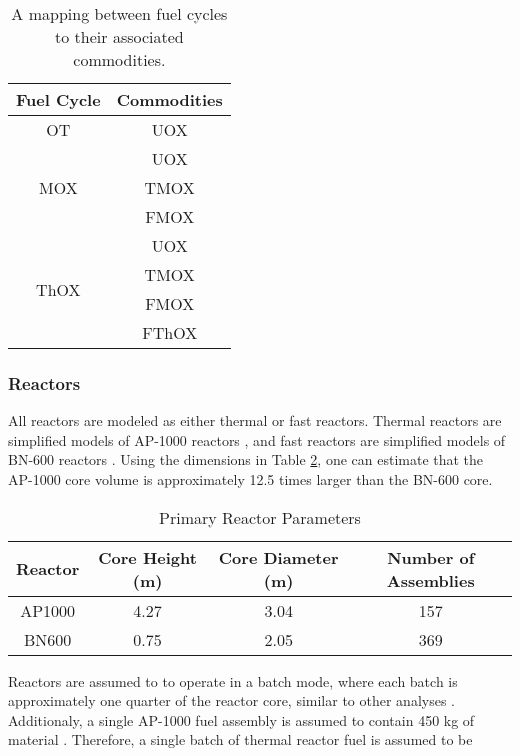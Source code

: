 \begin{table}[h]
\centering
\caption{A mapping between fuel cycles to their associated commodities.}
\label{tbl:fc_to_commods}
\begin{tabular}{|c|c|}
\hline
Fuel Cycle            & Commodities \\ \hline
OT                    & UOX         \\ \hline
\multirow{3}{*}{MOX}  & UOX         \\  
                      & TMOX        \\  
                      & FMOX        \\ \hline
\multirow{4}{*}{ThOX} & UOX         \\  
                      & TMOX        \\  
                      & FMOX        \\  
                      & FThOX       \\ \hline
\end{tabular}
\end{table}

\subsubsection{Reactors}

All reactors are modeled as either thermal or fast reactors. Thermal reactors
are simplified models of AP-1000 reactors \cite{ARIS}, and fast reactors are
simplified models of BN-600 reactors \cite{reactors2007experience}. Using the
dimensions in Table \ref{tbl:rx_params}, one can estimate that the AP-1000 core
volume is approximately 12.5 times larger than the BN-600 core. 

\begin{table}[h]
\centering
\caption{Primary Reactor Parameters}
\label{tbl:rx_params}
\begin{tabular}{|c|c|c|c|}
\hline
Reactor & Core Height (m) & Core Diameter (m) & Number of Assemblies \\ \hline
AP1000  & 4.27            & 3.04              & 157 \\ \hline
BN600   & 0.75            & 2.05              & 369 \\ \hline
\end{tabular}
\end{table}

Reactors are assumed to to operate in a batch mode, where each batch is
approximately one quarter of the reactor core, similar to other analyses
\cite{rineiski2011reactivity}. Additionaly, a single AP-1000 fuel assembly is
assumed to contain 450 kg of material \cite{kok2009nuclear}. Therefore, a single
batch of thermal reactor fuel is assumed to be

